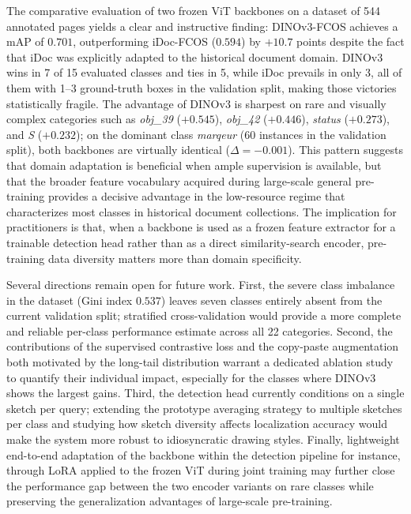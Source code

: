 \documentclass{iopjournal}
\begin{document}
The comparative evaluation of two frozen ViT backbones on a dataset of 544
annotated pages yields a clear and instructive finding: DINOv3-FCOS achieves a
mAP of $0.701$, outperforming iDoc-FCOS ($0.594$) by $+10.7$ points despite
the fact that iDoc was explicitly adapted to the historical document domain.
DINOv3 wins in 7 of 15 evaluated classes and ties in 5, while iDoc prevails
in only 3, all of them with 1--3 ground-truth boxes in the validation split,
making those victories statistically fragile.
The advantage of DINOv3 is sharpest on rare and visually complex categories
such as \textit{obj\_39} ($+0.545$), \textit{obj\_42} ($+0.446$),
\textit{status} ($+0.273$), and \textit{S} ($+0.232$); on the dominant class
\textit{marqeur} (60 instances in the validation split), both backbones are
virtually identical ($\Delta = -0.001$).
This pattern suggests that domain adaptation is beneficial when ample
supervision is available, but that the broader feature vocabulary acquired
during large-scale general pre-training provides a decisive advantage in the
low-resource regime that characterizes most classes in historical document
collections.
The implication for practitioners is that, when a backbone is used as a frozen
feature extractor for a trainable detection head rather than as a direct
similarity-search encoder, pre-training data diversity matters more than
domain specificity.
 
Several directions remain open for future work.
First, the severe class imbalance in the dataset (Gini index $0.537$) leaves
seven classes entirely absent from the current validation split; stratified
cross-validation would provide a more complete and reliable per-class
performance estimate across all 22 categories.
Second, the contributions of the supervised contrastive loss and the copy-paste
augmentation both motivated by the long-tail distribution warrant a
dedicated ablation study to quantify their individual impact, especially for
the classes where DINOv3 shows the largest gains.
Third, the detection head currently conditions on a single sketch per query;
extending the prototype averaging strategy to multiple sketches per class and
studying how sketch diversity affects localization accuracy would make the
system more robust to idiosyncratic drawing styles.
Finally, lightweight end-to-end adaptation of the backbone within the detection
pipeline for instance, through LoRA applied to the frozen ViT during joint
training may further close the performance gap between the two encoder
variants on rare classes while preserving the generalization advantages of
large-scale pre-training.



\end{document}
